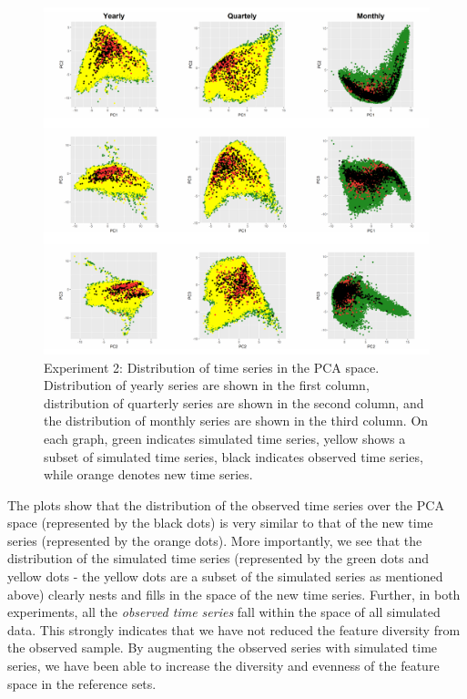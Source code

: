 \documentclass[11pt,a4paper,]{article}
\begin{document}
\begin{figure}

{\centering \includegraphics[width=\textwidth]{figure/exp2pca-1} 

}

\caption{Experiment 2: Distribution of time series in the PCA space. Distribution of yearly series are shown in the first column, distribution of quarterly series are shown in the second column, and the distribution of monthly series are shown in the third column. On each graph, green indicates simulated time series, yellow shows a subset of simulated time series, black indicates observed time series, while orange denotes new time series.}\label{fig:exp2pca}
\end{figure}

The plots show that the distribution of the observed time series over the PCA space (represented by the black dots) is very similar to that of the new time series (represented by the orange dots). More importantly, we see that the distribution of the simulated time series (represented by the green dots and yellow dots - the yellow dots are a subset of the simulated series as mentioned above) clearly nests and fills in the space of the new time series. Further, in both experiments, all the \emph{observed time series} fall within the space of all simulated data. This strongly indicates that we have not reduced the feature diversity from the observed sample. By augmenting the observed series with simulated time series, we have been able to increase the diversity and evenness of the feature space in the reference sets.
\end{document}
